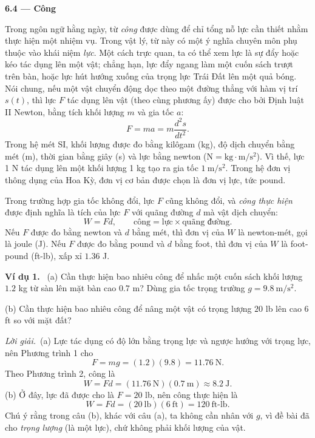 \documentclass[12pt,a4paper]{article}
\newcommand{\ex}[1]{\par\medskip\noindent\textbf{Ví dụ #1.}\ }
\newcommand{\sol}{\par\nopagebreak[4]\noindent\textit{Lời giải.}\ }
\begin{document}
\begin{center}{\LARGE\bfseries 6.4 — Công}\end{center}
Trong ngôn ngữ hằng ngày, từ \textit{công} được dùng để chỉ tổng nỗ lực cần thiết nhằm thực hiện một nhiệm vụ. Trong vật lý, từ này có một ý nghĩa chuyên môn phụ thuộc vào khái niệm \textit{lực}. Một cách trực quan, ta có thể xem lực là sự đẩy hoặc kéo tác dụng lên một vật; chẳng hạn, lực đẩy ngang làm một cuốn sách trượt trên bàn, hoặc lực hút hướng xuống của trọng lực Trái Đất lên một quả bóng. Nói chung, nếu một vật chuyển động dọc theo một đường thẳng với hàm vị trí $s(t)$, thì lực $F$ tác dụng lên vật (theo cùng phương ấy) được cho bởi Định luật II Newton, bằng tích khối lượng $m$ và gia tốc $a$:
\begin{equation}F=ma=m\frac{d^2s}{dt^2}.\tag{1}\end{equation}
Trong hệ mét SI, khối lượng được đo bằng kilôgam (kg), độ dịch chuyển bằng mét (m), thời gian bằng giây (s) và lực bằng newton ($\mathrm N=\mathrm{kg}\cdot\mathrm m/\mathrm s^2$). Vì thế, lực 1 N tác dụng lên một khối lượng 1 kg tạo ra gia tốc $1\ \mathrm{m/s^2}$. Trong hệ đơn vị thông dụng của Hoa Kỳ, đơn vị cơ bản được chọn là đơn vị lực, tức pound.

Trong trường hợp gia tốc không đổi, lực $F$ cũng không đổi, và \textit{công thực hiện} được định nghĩa là tích của lực $F$ với quãng đường $d$ mà vật dịch chuyển:
\begin{equation}W=Fd,\qquad \text{công}=\text{lực}\times\text{quãng đường}.\tag{2}\end{equation}
Nếu $F$ được đo bằng newton và $d$ bằng mét, thì đơn vị của $W$ là newton-mét, gọi là joule (J). Nếu $F$ được đo bằng pound và $d$ bằng foot, thì đơn vị của $W$ là foot-pound (ft-lb), xấp xỉ $1.36$ J.

\ex{1} (a) Cần thực hiện bao nhiêu công để nhấc một cuốn sách khối lượng $1.2$ kg từ sàn lên mặt bàn cao $0.7$ m? Dùng gia tốc trọng trường $g=9.8\ \mathrm{m/s^2}$.

(b) Cần thực hiện bao nhiêu công để nâng một vật có trọng lượng $20$ lb lên cao $6$ ft so với mặt đất?
\sol (a) Lực tác dụng có độ lớn bằng trọng lực và ngược hướng với trọng lực, nên Phương trình 1 cho
\[F=mg=(1.2)(9.8)=11.76\ \mathrm N.\]
Theo Phương trình 2, công là
\[W=Fd=(11.76\ \mathrm N)(0.7\ \mathrm m)\approx8.2\ \mathrm J.\]
(b) Ở đây, lực đã được cho là $F=20$ lb, nên công thực hiện là
\[W=Fd=(20\ \mathrm{lb})(6\ \mathrm{ft})=120\ \text{ft-lb}.\]
Chú ý rằng trong câu (b), khác với câu (a), ta không cần nhân với $g$, vì đề bài đã cho \textit{trọng lượng} (là một lực), chứ không phải khối lượng của vật.
\end{document}
